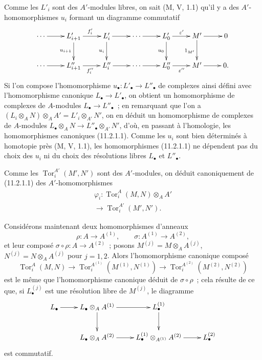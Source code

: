 Comme les $L'_i$ sont des $A'$-modules libres, on sait (M, V, 1.1) qu'il y a
des $A'$-homomorphismes $u_i$ formant un diagramme commutatif
\[
\xymatrix{
\cdots\ar[r]&L'_{i+1}\ar[r]^{f'_i}\ar[d]_{u_{i+1}}&
L'_i\ar[r]\ar[d]_{u_i}&\cdots\ar[r]&
L'_0\ar[r]^{\varepsilon'}\ar[d]_{u_0}&M'\ar[r]\ar[d]_{1_{M'}}&0\\
\cdots\ar[r]&L''_{i+1}\ar[r]_{f''_i}&L''_i\ar[r]&\cdots\ar[r]&
L''_0\ar[r]_{\varepsilon''}&M'\ar[r]&0.
}
\]
Si l'on compose l'homomorphisme $u_\bullet:L'_\bullet\to L''_\bullet$ de
complexes ainsi défini avec l'homomorphisme canonique
$L_\bullet\to L'_\bullet$, on obtient un homomorphisme de complexes de
$A$-modules $L_\bullet\to L''_\bullet$~; en remarquant que l'on a
$(L_i\otimes_AN)\otimes_AA'=L'_i\otimes_{A'}N'$, on en déduit un
homomorphisme de complexes de $A$-modules
$L_\bullet\otimes_AN\to L''_\bullet\otimes_{A'}N'$, d'où, en passant à
l'homologie, les homomorphismes canoniques (11.2.1.1). Comme les $u_i$ sont
bien déterminés à homotopie près (M, V, 1.1), les homomorphismes (11.2.1.1)
ne dépendent pas du choix des $u_i$ ni du choix des résolutions libres
$L_\bullet$ et $L''_\bullet$.

\begin{sloppypar}
Comme les $\operatorname{Tor}_i^{A'}(M',N')$ sont des $A'$-modules, on déduit
canoniquement de (11.2.1.1) des $A'$-homomorphismes
\begin{equation}
\begin{gathered}
\varphi_i:\operatorname{Tor}_i^A(M,N)\otimes_AA'\\[-2pt]
\longrightarrow\operatorname{Tor}_i^{A'}(M',N').
\end{gathered}
\label{IV.11.2.1.5-fr}
\tag{11.2.1.5}
\end{equation}
\end{sloppypar}

Considérons maintenant deux homomorphismes d'anneaux
\[
\rho:A\to A^{(1)},\qquad \sigma:A^{(1)}\to A^{(2)},
\]
et leur composé $\sigma\circ\rho:A\to A^{(2)}$~; posons
$M^{(j)}=M\otimes_AA^{(j)}$, $N^{(j)}=N\otimes_AA^{(j)}$ pour $j=1,2$.
Alors l'homomorphisme canonique composé
\[
\operatorname{Tor}_i^A(M,N)\to
\operatorname{Tor}_i^{A^{(1)}}(M^{(1)},N^{(1)})\to
\operatorname{Tor}_i^{A^{(2)}}(M^{(2)},N^{(2)})
\]
est le même que l'homomorphisme canonique déduit de $\sigma\circ\rho$~;
cela résulte de ce que, si $L_\bullet^{(j)}$ est une résolution libre de
$M^{(j)}$, le diagramme
\[
\xymatrix{
L_\bullet\ar[r]&L_\bullet\otimes_AA^{(1)}\ar[r]\ar[d]&
L_\bullet^{(1)}\ar[d]\\
&L_\bullet\otimes_AA^{(2)}\ar[r]&
L_\bullet^{(1)}\otimes_{A^{(1)}}A^{(2)}\ar[r]&L_\bullet^{(2)}
}
\]
est commutatif.

